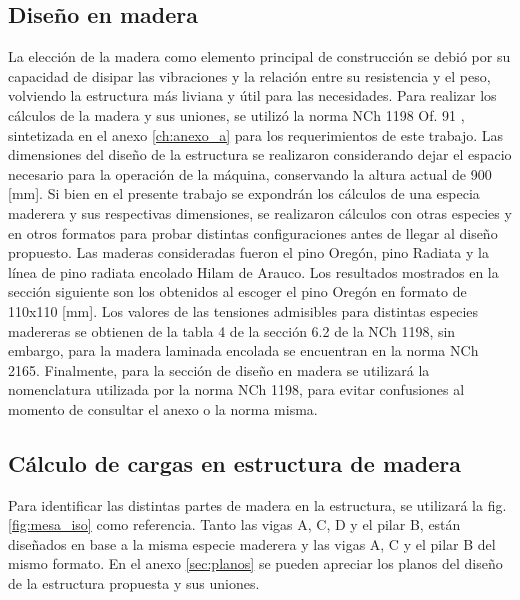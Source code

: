 \subsection{Diseño en madera}
La elección de la madera como elemento principal de construcción se debió por su capacidad de disipar las vibraciones y la relación entre su resistencia y el peso, volviendo la estructura más liviana y útil para las necesidades. Para realizar los cálculos de la madera y sus uniones, se utilizó la norma NCh 1198 Of. 91 \cite{nch1198}, sintetizada en el anexo \ref{ch:anexo_a} para los requerimientos de este trabajo. Las dimensiones del diseño de la estructura se realizaron considerando dejar el espacio necesario para la operación de la máquina, conservando la altura actual de 900 [mm]. Si bien en el presente trabajo se expondrán los cálculos de una especia maderera y sus respectivas dimensiones, se realizaron cálculos con otras especies y en otros formatos para probar distintas configuraciones antes de llegar al diseño propuesto. Las maderas consideradas fueron el pino Oregón, pino Radiata y la línea de pino radiata encolado Hilam de Arauco. Los resultados mostrados en la sección siguiente son los obtenidos al escoger el pino Oregón en formato de 110x110 [mm]. Los valores de las tensiones admisibles para distintas especies madereras se obtienen de la tabla 4 de la sección 6.2 de la NCh 1198, sin embargo, para la madera laminada encolada se encuentran en la norma NCh 2165. Finalmente, para la sección de diseño en madera se utilizará la nomenclatura utilizada por la norma NCh 1198, para evitar confusiones al momento de consultar el anexo o la norma misma.

\subsection{Cálculo de cargas en estructura de madera}
Para identificar las distintas partes de madera en la estructura, se utilizará la fig. \ref{fig:mesa_iso} como referencia. Tanto las vigas A, C, D y el pilar B, están diseñados en base a la misma especie maderera y las vigas A, C y el pilar B del mismo formato. En el anexo \ref{sec:planos} se pueden apreciar los planos del diseño de la estructura propuesta y sus uniones.

